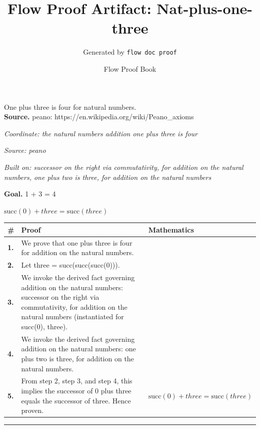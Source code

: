 \documentclass[11pt]{article}
\title{Flow Proof Artifact: Nat-plus-one-three}
\author{Generated by \texttt{flow doc proof}}
\date{Flow Proof Book}
\theoremstyle{definition}
\begin{document}
\maketitle
One plus three is four for natural numbers.\\[0.5em]
\textbf{Source.} peano: https://en.wikipedia.org/wiki/Peano\_axioms\\[0.5em]
\bigskip
{}\par
\smallskip\noindent\textit{Coordinate: the natural numbers \cdot addition \cdot one plus three is four}\par
\smallskip\noindent\textit{Source: peano}\par
\smallskip\noindent\textit{Built on: successor on the right via commutativity, for addition on the natural numbers, one plus two is three, for addition on the natural numbers}\par
\medskip
\noindent\textbf{Goal.} 1 + 3 = 4\par
\noindent$\displaystyle \mathrm{succ}(0) + three = \mathrm{succ}(three)$\par
\medskip
\noindent
\begin{tabular}{@{} >{\raggedright\arraybackslash}p{} >{\raggedright\arraybackslash}p{} >{\raggedleft\arraybackslash}p{} @{}}
\textbf{\#} & \textbf{Proof} & \textbf{Mathematics} \\
\midrule
\textbf{1.} & We prove that one plus three is four for addition on the natural numbers. & \\[0.45em]
\textbf{2.} & Let three = succ(succ(succ(0))). & \\[0.45em]
\textbf{3.} & We invoke the derived fact governing addition on the natural numbers: successor on the right via commutativity, for addition on the natural numbers (instantiated for succ(0), three). & \\[0.45em]
\textbf{4.} & We invoke the derived fact governing addition on the natural numbers: one plus two is three, for addition on the natural numbers. & \\[0.45em]
\textbf{5.} & From step 2, step 3, and step 4, this implies the successor of 0 plus three equals the successor of three. Hence proven. & $\displaystyle \mathrm{succ}(0) + three = \mathrm{succ}(three)$ \\[0.45em]
\bottomrule
\end{tabular}
\label{thm:Nat-addition-one_plus_three_is_four}
\par\medskip\hrule
\end{document}
